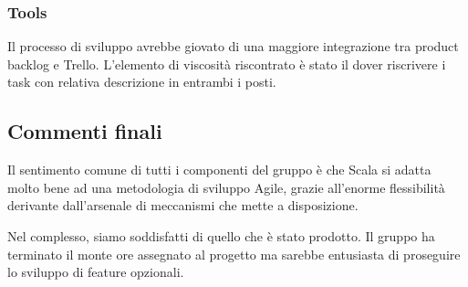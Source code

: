\subsubsection{Tools}
Il processo di sviluppo avrebbe giovato di una maggiore integrazione tra product backlog e Trello. L'elemento di viscosità riscontrato è stato il dover riscrivere i task con relativa descrizione in entrambi i posti.



\subsection{Commenti finali}
Il sentimento comune di tutti i componenti del gruppo è che Scala si adatta molto bene ad una metodologia di sviluppo Agile, grazie all'enorme flessibilità derivante dall'arsenale di meccanismi che mette a disposizione.

Nel complesso, siamo soddisfatti di quello che è stato prodotto. Il gruppo ha terminato il monte ore assegnato al progetto ma sarebbe entusiasta di proseguire lo sviluppo di feature opzionali.
